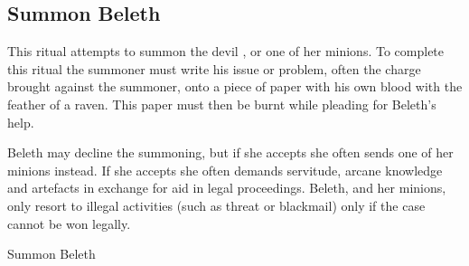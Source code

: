 \subsection{Summon Beleth}
\label{sec:Summon Beleth}

This ritual attempts to summon the devil , or one of her
minions. To complete this ritual the summoner must write his issue or problem,
often the charge brought against the summoner, onto a piece of paper with his
own blood with the feather of a raven. This paper must then be burnt while
pleading for Beleth's help.

Beleth may decline the summoning, but if she accepts she often sends one of
her minions instead. If she accepts she often demands servitude, arcane
knowledge and artefacts in exchange for aid in legal proceedings. Beleth, and
her minions, only resort to illegal activities (such as threat or blackmail)
only if the case cannot be won legally.

\begin{35e}{Summon Beleth}
\end{35e}
